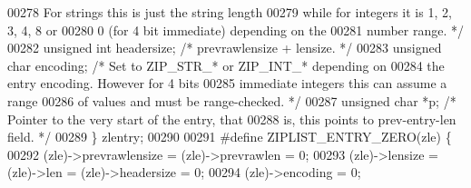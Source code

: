 \begin{DoxyCode}
00278 \textcolor{comment}{                                    For strings this is just the string length}
00279 \textcolor{comment}{                                    while for integers it is 1, 2, 3, 4, 8 or}
00280 \textcolor{comment}{                                    0 (for 4 bit immediate) depending on the}
00281 \textcolor{comment}{                                    number range. */}
00282     \textcolor{keywordtype}{unsigned} \textcolor{keywordtype}{int} headersize;     \textcolor{comment}{/* prevrawlensize + lensize. */}
00283     \textcolor{keywordtype}{unsigned} \textcolor{keywordtype}{char} encoding;      \textcolor{comment}{/* Set to ZIP\_STR\_* or ZIP\_INT\_* depending on}
00284 \textcolor{comment}{                                    the entry encoding. However for 4 bits}
00285 \textcolor{comment}{                                    immediate integers this can assume a range}
00286 \textcolor{comment}{                                    of values and must be range-checked. */}
00287     \textcolor{keywordtype}{unsigned} \textcolor{keywordtype}{char} *p;            \textcolor{comment}{/* Pointer to the very start of the entry, that}
00288 \textcolor{comment}{                                    is, this points to prev-entry-len field. */}
00289 \} zlentry;
00290 
00291 \textcolor{preprocessor}{#}\textcolor{preprocessor}{define} \textcolor{preprocessor}{ZIPLIST\_ENTRY\_ZERO}\textcolor{preprocessor}{(}\textcolor{preprocessor}{zle}\textcolor{preprocessor}{)} \textcolor{preprocessor}{\{}
00292     \textcolor{preprocessor}{(}\textcolor{preprocessor}{zle}\textcolor{preprocessor}{)}\textcolor{preprocessor}{->}\textcolor{preprocessor}{prevrawlensize} \textcolor{preprocessor}{=} \textcolor{preprocessor}{(}\textcolor{preprocessor}{zle}\textcolor{preprocessor}{)}\textcolor{preprocessor}{->}\textcolor{preprocessor}{prevrawlen} \textcolor{preprocessor}{=} 0\textcolor{preprocessor}{;}
00293     \textcolor{preprocessor}{(}\textcolor{preprocessor}{zle}\textcolor{preprocessor}{)}\textcolor{preprocessor}{->}\textcolor{preprocessor}{lensize} \textcolor{preprocessor}{=} \textcolor{preprocessor}{(}\textcolor{preprocessor}{zle}\textcolor{preprocessor}{)}\textcolor{preprocessor}{->}\textcolor{preprocessor}{len} \textcolor{preprocessor}{=} \textcolor{preprocessor}{(}\textcolor{preprocessor}{zle}\textcolor{preprocessor}{)}\textcolor{preprocessor}{->}\textcolor{preprocessor}{headersize} \textcolor{preprocessor}{=} 0\textcolor{preprocessor}{;}
00294     \textcolor{preprocessor}{(}\textcolor{preprocessor}{zle}\textcolor{preprocessor}{)}\textcolor{preprocessor}{->}\textcolor{preprocessor}{encoding} \textcolor{preprocessor}{=} 0\textcolor{preprocessor}{;}

\end{DoxyCode}
